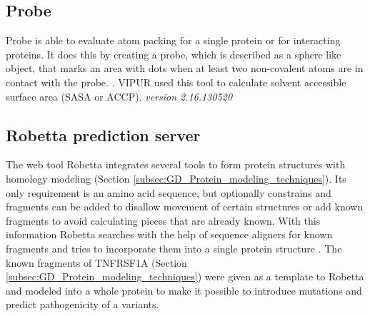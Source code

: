 \subsection{Probe}
Probe is able to evaluate atom packing for a single protein or for interacting proteins. It does this by creating a probe, which is described as a sphere like object, that marks an area with dots when at least two non-covalent atoms are in contact with the probe. \cite{word_visualizing_1999, richardson_lab_probe_nodate}. VIPUR used this tool to calculate solvent accessible surface area (SASA or ACCP).
\label{subsec:MM_Probe}
\newline
\textit{version 2.16.130520}

\subsection{Robetta prediction server}
The web tool Robetta integrates several tools to form protein structures with homology modeling (Section \ref{subsec:GD_Protein_modeling_techniques}).
Its only requirement is an amino acid sequence, but optionally constrains and fragments can be added to disallow movement of certain structures or add known fragments to avoid calculating pieces that are already known. With this information Robetta searches with the help of sequence aligners for known fragments and tries to incorporate them into a single protein structure \cite{song_high-resolution_2013,soding_protein_2005,kallberg_template-based_2012,yang_improving_2011,ovchinnikov_protein_2017}.
The known fragments of TNFRSF1A (Section \ref{subsec:GD_Protein_modeling_techniques}) were given as a template to Robetta and modeled into a whole protein to make it possible to introduce mutations and predict pathogenicity of a variants.
\label{subsec:MM_Robetta}

